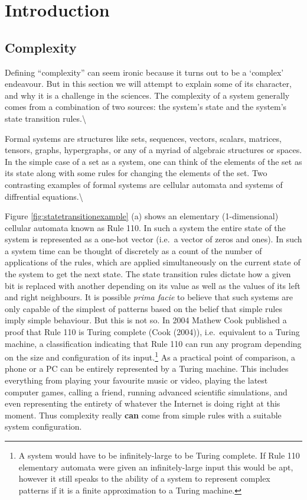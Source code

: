 \documentclass[
  letterpaper,
  DIV=11,
  numbers=noendperiod]{scrreprt}
\begin{document}

\chapter{Introduction}\label{introduction}

\section{Complexity}\label{complexity}

Defining ``complexity'' can seem ironic because it turns out to be a
`complex' endeavour. But in this section we will attempt to explain some
of its character, and why it is a challenge in the sciences. The
complexity of a system generally comes from a combination of two
sources: the system's state and the system's state transition
rules.\textbackslash{}

Formal systems are structures like sets, sequences, vectors, scalars,
matrices, tensors, graphs, hypergraphs, or any of a myriad of algebraic
structures or spaces. In the simple case of a set as a system, one can
think of the elements of the set as its state along with some rules for
changing the elements of the set. Two contrasting examples of formal
systems are cellular automata and systems of diffrential
equations.\textbackslash{}

Figure \ref{fig:statetransitionexample} (a) shows an elementary
(1-dimensional) cellular automata known as Rule 110. In such a system
the entire state of the system is represented as a one-hot vector
(i.e.~a vector of zeros and ones). In such a system time can be thought
of discretely as a count of the number of applications of the rules,
which are applied simultaneously on the current state of the system to
get the next state. The state transition rules dictate how a given bit
is replaced with another depending on its value as well as the values of
its left and right neighbours. It is possible \emph{prima facie} to
believe that such systems are only capable of the simplest of patterns
based on the belief that simple rules imply simple behaviour. But this
is not so. In 2004 Mathew Cook published a proof that Rule 110 is Turing
complete (Cook (2004)), i.e.~equivalent to a Turing machine, a
classification indicating that Rule 110 can run any program depending on
the size and configuration of its
input.\footnote{A system would have to be infinitely-large to be Turing complete. If Rule 110 elementary automata were given an infinitely-large input this would be apt, however it still speaks to the ability of a system to represent complex patterns if it is a finite approximation to a Turing machine.}
As a practical point of comparison, a phone or a PC can be entirely
represented by a Turing machine. This includes everything from playing
your favourite music or video, playing the latest computer games,
calling a friend, running advanced scientific simulations, and even
representing the entirety of whatever the Internet is doing right at
this moment. Thus complexity really \textbf{can} come from simple rules
with a suitable system configuration.
\end{document}
